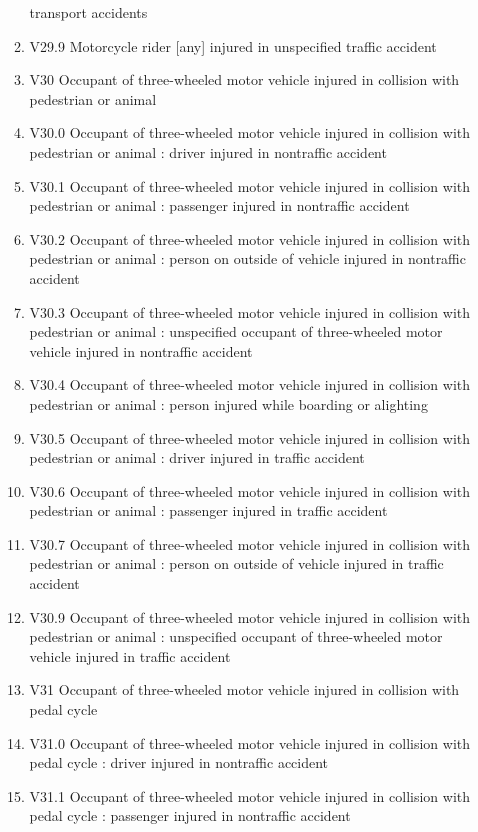 \documentclass[
]{scrartcl}
\begin{document}
\begin{itemize}
\begin{enumerate}
    transport accidents
  \item
    V29.9 Motorcycle rider {[}any{]} injured in unspecified traffic
    accident
  \item
    V30 Occupant of three-wheeled motor vehicle injured in collision
    with pedestrian or animal
  \item
    V30.0 Occupant of three-wheeled motor vehicle injured in collision
    with pedestrian or animal : driver injured in nontraffic accident
  \item
    V30.1 Occupant of three-wheeled motor vehicle injured in collision
    with pedestrian or animal : passenger injured in nontraffic accident
  \item
    V30.2 Occupant of three-wheeled motor vehicle injured in collision
    with pedestrian or animal : person on outside of vehicle injured in
    nontraffic accident
  \item
    V30.3 Occupant of three-wheeled motor vehicle injured in collision
    with pedestrian or animal : unspecified occupant of three-wheeled
    motor vehicle injured in nontraffic accident
  \item
    V30.4 Occupant of three-wheeled motor vehicle injured in collision
    with pedestrian or animal : person injured while boarding or
    alighting
  \item
    V30.5 Occupant of three-wheeled motor vehicle injured in collision
    with pedestrian or animal : driver injured in traffic accident
  \item
    V30.6 Occupant of three-wheeled motor vehicle injured in collision
    with pedestrian or animal : passenger injured in traffic accident
  \item
    V30.7 Occupant of three-wheeled motor vehicle injured in collision
    with pedestrian or animal : person on outside of vehicle injured in
    traffic accident
  \item
    V30.9 Occupant of three-wheeled motor vehicle injured in collision
    with pedestrian or animal : unspecified occupant of three-wheeled
    motor vehicle injured in traffic accident
  \item
    V31 Occupant of three-wheeled motor vehicle injured in collision
    with pedal cycle
  \item
    V31.0 Occupant of three-wheeled motor vehicle injured in collision
    with pedal cycle : driver injured in nontraffic accident
  \item
    V31.1 Occupant of three-wheeled motor vehicle injured in collision
    with pedal cycle : passenger injured in nontraffic accident

\end{enumerate}
\end{itemize}
\end{document}
